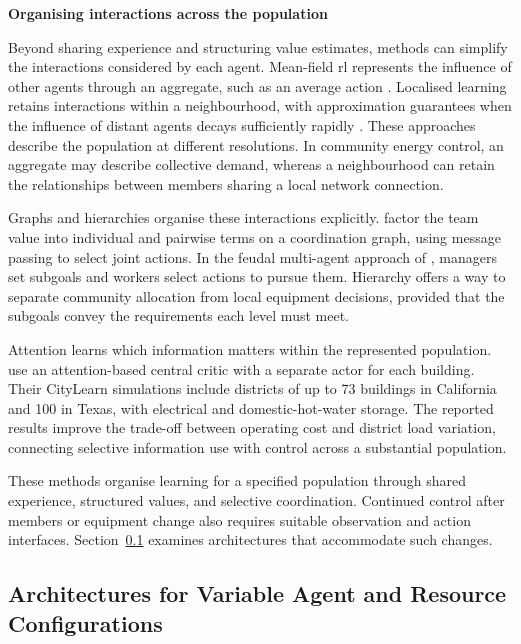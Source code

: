 \smallskip
\noindent\textbf{Organising interactions across the population}\par\nobreak\smallskip
Beyond sharing experience and structuring value estimates, methods can simplify the interactions considered by each agent. Mean-field \gls{rl} represents the influence of other agents through an aggregate, such as an average action \parencite{yang2018meanfield}. Localised learning retains interactions within a neighbourhood, with approximation guarantees when the influence of distant agents decays sufficiently rapidly \parencite{qu2020scalable}. These approaches describe the population at different resolutions. In community energy control, an aggregate may describe collective demand, whereas a neighbourhood can retain the relationships between members sharing a local network connection.

Graphs and hierarchies organise these interactions explicitly. \textcite{boehmer2020coordination} factor the team value into individual and pairwise terms on a coordination graph, using message passing to select joint actions. In the feudal multi-agent approach of \textcite{ahilan2019feudal}, managers set subgoals and workers select actions to pursue them. Hierarchy offers a way to separate community allocation from local equipment decisions, provided that the subgoals convey the requirements each level must meet.

Attention learns which information matters within the represented population. \textcite{savino2025attention} use an attention-based central critic with a separate actor for each building. Their CityLearn simulations include districts of up to 73 buildings in California and 100 in Texas, with electrical and domestic-hot-water storage. The reported results improve the trade-off between operating cost and district load variation, connecting selective information use with control across a substantial population.

These methods organise learning for a specified population through shared experience, structured values, and selective coordination. Continued control after members or equipment change also requires suitable observation and action interfaces. Section~\ref{sec:ch3-reconfiguration} examines architectures that accommodate such changes.

\subsection{Architectures for Variable Agent and Resource Configurations}
\label{sec:ch3-reconfiguration}

